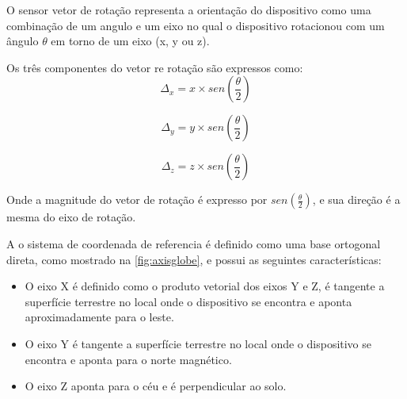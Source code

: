 O sensor vetor de rotação representa a orientação do dispositivo como uma combinação  de um angulo e um eixo no qual o dispositivo rotacionou com um ângulo $\theta$ em torno de um eixo (x, y ou z).  \par
Os três componentes do vetor re rotação são expressos como:\\

\begin{equation}
\Delta_x = x \times sen(\frac{\theta}{2})
\label{eq:vec_rot_x}
\end{equation}

\begin{equation}
\Delta_y = y \times sen(\frac{\theta}{2})
\label{eq:vec_rot_y}
\end{equation}

\begin{equation}
\Delta_z = z \times sen(\frac{\theta}{2})
\label{eq:vec_rot_z}
\end{equation}

Onde a magnitude do vetor de rotação é expresso por $sen(\frac{\theta}{2})$, e sua direção é a mesma do eixo de rotação.\par

A o sistema de coordenada de referencia é definido como uma base ortogonal direta, como mostrado na \autoref{fig:axisglobe}, e possui as seguintes características:\par
\begin{itemize}
\item O eixo X é definido como o produto vetorial dos eixos Y e Z, é tangente a superfície terrestre no local onde o dispositivo se encontra e aponta aproximadamente para o leste.\par

\item O eixo Y é tangente a superfície terrestre no local onde o dispositivo se encontra e aponta para o norte magnético. \par

\item O eixo Z aponta para o céu e é perpendicular ao solo.
\end{itemize}
